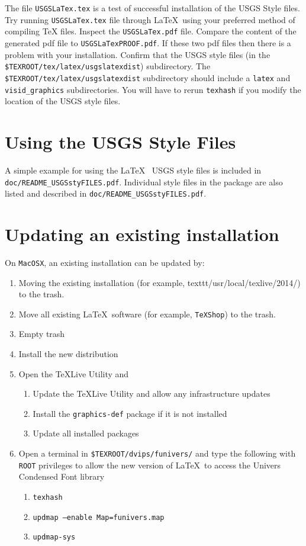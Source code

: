 \documentclass[11pt]{article}
\begin{document}
The file \texttt{USGSLaTex.tex} is a test of successful installation of the USGS Style files. Try running \texttt{USGSLaTex.tex} file through \LaTeX\ using your preferred method of compiling  \TeX \hspace{1pt} files. Inspect the \texttt{USGSLaTex.pdf} file. Compare the content of the generated \textsf{pdf} file to \texttt{USGSLaTexPROOF.pdf}. If these two \textsf{pdf} files then there is a problem with your installation. Confirm that the USGS style files (in the \texttt{\$TEXROOT/tex/latex/usgslatexdist}) subdirectory. The \texttt{\$TEXROOT/tex/latex/usgslatexdist} subdirectory should include a \texttt{latex} and \texttt{visid\_graphics} subdirectories. You will have to rerun \texttt{texhash} if you modify the location of the USGS style files.

\section*{\textsf{Using the USGS Style Files}}
A simple example for using the \LaTeX\ \hspace{1pt} USGS style files is included in \texttt{doc/README\_USGSstyFILES.pdf}. Individual style files in the package are also listed and described in \texttt{doc/README\_USGSstyFILES.pdf}.

\section*{\textsf{Updating an existing installation}}
On \texttt{MacOSX}, an existing installation can be updated by:

\begin{enumerate}
	\item Moving the existing installation (for example, texttt{/usr/local/texlive/2014/}) to the trash.
	\item Move all existing \LaTeX\ software (for example, \texttt{TeXShop}) to the trash.
	\item Empty trash
	\item Install the new distribution
	\item Open the \TeX Live Utility and
	\begin{enumerate}
		\item Update the \TeX Live Utility and allow any infrastructure updates
		\item Install the \texttt{graphics-def} package if it is not installed
		\item Update all installed packages
	\end{enumerate}
	\item Open a terminal in \texttt{\$TEXROOT/dvips/funivers/} and type the following with \texttt{ROOT} privileges to allow the new version of \LaTeX\ to access the Univers Condensed Font library
	\begin{enumerate}
		\item \texttt{texhash}
		\item \texttt{updmap --enable Map=funivers.map}
		\item \texttt{updmap-sys}
	\end{enumerate}
	
	
\end{enumerate}
\end{document}
